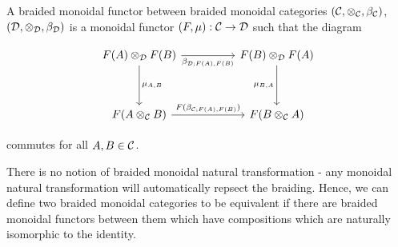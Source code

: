 \begin{ex}\label{braided-monoidal-examples}
\end{ex}

\begin{defn} A braided monoidal functor between braided monoidal categories $({\mathcal C},\otimes_{{\mathcal C}},\beta_{{\mathcal C}})$, $({\mathcal D},\otimes_{{\mathcal D}},\beta_{{\mathcal D}})$ is a monoidal functor $(F,\mu):{\mathcal C}\to {\mathcal D}$ such that the diagram

\[\begin{tikzcd}
	{F(A)\otimes_{\cD}F(B)} && {F(B)\otimes_{\cD}F(A)} \\
	\\
	{F(A\otimes_{\cC}B)} && {F(B\otimes_{\cC}A)}
	\arrow["{\mu_{A,B}}", from=1-1, to=3-1]
	\arrow["{\beta_{\cD;F(A),F(B)}}"', from=1-1, to=1-3]
	\arrow["{\mu_{B,A}}"', from=1-3, to=3-3]
	\arrow["{F(\beta_{\cC;F(A),F(B)})}", from=3-1, to=3-3]
\end{tikzcd}\]

commutes for all $A,B\in {\mathcal C}$.
\end{defn}

\begin{rem}
There is no notion of braided monoidal natural transformation - any monoidal natural transformation will automatically repsect the braiding. Hence, we can define two braided monoidal categories to be equivalent if there are braided monoidal functors between them which have compositions which are naturally isomorphic to the identity.
\end{rem}


